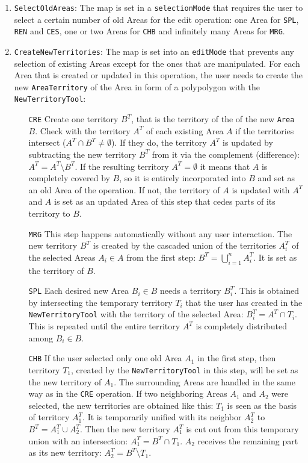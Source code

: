 \begin{enumerate}

  \item \texttt{SelectOldAreas}: The map is set in a \texttt{selectionMode} that requires the user to select a certain number of old Areas for the edit operation: one Area for \texttt{SPL}, \texttt{REN} and \texttt{CES}, one or two Areas for \texttt{CHB} and infinitely many Areas for \texttt{MRG}.

  \item \texttt{CreateNewTerritories}: The map is set into an \texttt{editMode} that prevents any selection of existing Areas except for the ones that are manipulated. For each Area that is created or updated in this operation, the user needs to create the new \texttt{AreaTerritory} of the Area in form of a polypolygon with the \texttt{NewTerritoryTool}:
  \begin{itemize}
    \item[\texttt{CRE}]
      Create one territory $B^T$, that is the territory of the of the new \texttt{Area} $B$.
      Check with the territory $A^T$ of each existing Area $A$ if the territories intersect ($A^T \cap B^T \neq \emptyset$).
      If they do, the territory $A^T$ is updated by subtracting the new territory $B^T$ from it via the complement (difference): $A^T = A^T \setminus B^T$.
      If the resulting territory $A^T = \emptyset$ it means that $A$ is completely covered by $B$, so it is entirely incorporated into $B$ and set as an old Area of the operation.
      If not, the territory of $A$ is updated with $A^T$ and $A$ is
      set as an updated Area of this step that cedes parts of its territory to $B$.
    \item[\texttt{MRG}]
      This step happens automatically without any user interaction. The new territory $B^T$ is created by the cascaded union of the territories $A^T_i$ of the selected Areas $A_i \in A$ from the first step: $B^T = \bigcup\limits_{i=1}^n A^T_i$. It is set as the territory of $B$.
    \item[\texttt{SPL}]
      Each desired new Area $B_i \in B$ needs a territory $B_i^T$. This is obtained by intersecting the temporary territory $T_i$ that the user has created in the \texttt{NewTerritoryTool} with the territory of the selected Area: $B_i^T = A^T \cap T_i$. This is repeated until the entire territory $A^T$ is completely distributed among $B_i \in B$.
    \item[\texttt{CHB}]
      If the user selected only one old Area $A_1$ in the first step, then territory $T_1$, created by the \texttt{NewTerritoryTool} in this step, will be set as the new territory of $A_1$. The surrounding Areas are handled in the same way as in the \texttt{CRE} operation. If two neighboring Areas $A_1$ and $A_2$ were selected, the new territories are obtained like this: $T_1$ is seen as the basis of territory $A_1^T$. It is temporarily unified with its neighbor $A^T_2$ to $B^T = A_1^T \cup A_2^T$. Then the new territory $A_1^T$ is cut out from this temporary union with an intersection: $A_1^T = B^T \cap T_1$. $A_2$ receives the remaining part as its new territory: $A_2^T = B^T \setminus T_1$.

\end{itemize}
\end{enumerate}
